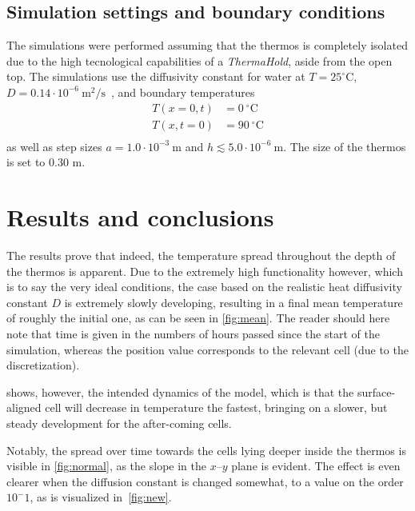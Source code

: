 \documentclass[a4paper,12pt]{article}
\theoremstyle{plain}
\theoremstyle{definition}
\begin{document}
   \subsection{Simulation settings and boundary conditions}
      \label{sec:bc}
      The simulations were performed assuming that the thermos is completely
      isolated due to the high tecnological capabilities of a
      \emph{ThermaHold\texttrademark}, aside from the open top. The simulations
      use the diffusivity constant for water at $T=25^\circ$C, $D = 0.14 \cdot
      10^{-6}~\si{\meter^2\per\s}$~\cite{diffusion}, and
      boundary temperatures 
      \begin{align*}
         T(x = 0,t)  &=  0~^\circ\text{C} \\
         T(x, t = 0) &=  90~^\circ\text{C} \\
      \end{align*}
      as well as step sizes $a = 1.0\cdot 10^{-3}~\si{\m}$ and $h \lesssim 5.0\cdot
      10^{-6}~\si{\m}$. The size of the thermos is set to 0.30 m.      

\section{Results and conclusions}
   The results prove that indeed, the temperature spread throughout the depth of
   the thermos is apparent. Due to the extremely high functionality however,
   which is to say the very ideal conditions, the case based on the realistic
   heat diffusivity constant $D$ is extremely slowly developing, resulting in a
   final mean temperature of roughly the initial one, as can be seen in
   \cref{fig:mean}. The reader should here note that time is given in the numbers
   of hours passed since the start of the simulation, whereas the position value
   corresponds to the relevant cell (due to the discretization).
   
    shows, however, the intended dynamics of
   the model, which is that the surface-aligned cell will decrease in
   temperature the fastest, bringing on a slower, but steady development for the
   after-coming cells. 
   
   Notably, the spread over time towards the cells lying deeper inside the
   thermos is visible in \cref{fig:normal}, as the slope in the $x$--$y$ plane
   is evident. The effect is even clearer when the diffusion constant is changed
   somewhat, to
   a value on the order $10^-1$, as is visualized in~\cref{fig:new}.
\end{document}
